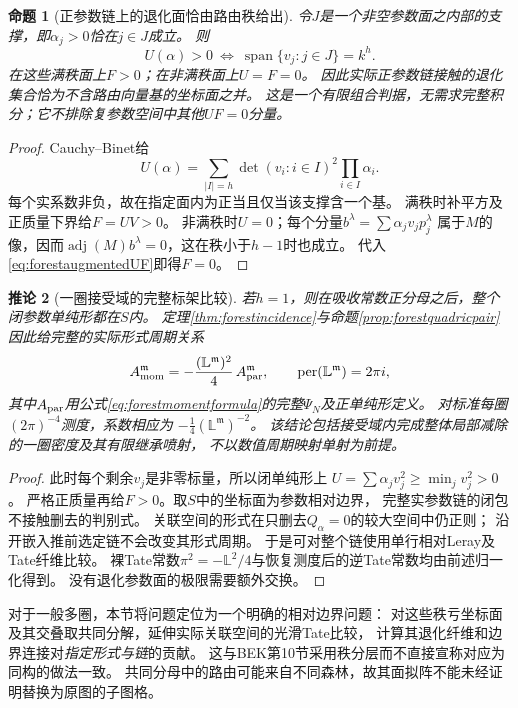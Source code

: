 \documentclass[11pt,a4paper]{ctexart}
\theoremstyle{cnplain}\newtheorem{theorem}{定理}[section]
\newtheorem{proposition}[theorem]{命题}
\newtheorem{corollary}[theorem]{推论}
\theoremstyle{definition}\newtheorem{definition}[theorem]{定义}
\theoremstyle{remark}\newtheorem{remark}[theorem]{注}
\begin{document}
\begin{proposition}[正参数链上的退化面恰由路由秩给出]
\label{prop:forestrankfaces}
令$J$是一个非空参数面之内部的支撑，即$\alpha_j>0$恰在$j\in J$成立。
则
\[
 U(\alpha)>0\ \Longleftrightarrow\
 \operatorname{span}\{v_j:j\in J\}=k^h.
\]
在这些满秩面上$F>0$；在非满秩面上$U=F=0$。
因此实际正参数链接触的退化集合恰为不含路由向量基的坐标面之并。
这是一个有限组合判据，无需求完整积分；它不排除复参数空间中其他$UF=0$分量。
\end{proposition}

\begin{proof}
Cauchy--Binet给
\[
 U(\alpha)=\sum_{|I|=h}\det(v_i:i\in I)^2\prod_{i\in I}\alpha_i.
\]
每个实系数非负，故在指定面内为正当且仅当该支撑含一个基。
满秩时补平方及正质量下界给$F=UV>0$。
非满秩时$U=0$；每个分量$b^\lambda=\sum\alpha_jv_jp_j^\lambda$
属于$M$的像，因而$\operatorname{adj}(M)b^\lambda=0$，这在秩小于$h-1$时也成立。
代入\eqref{eq:forestaugmentedUF}即得$F=0$。
\end{proof}

\begin{corollary}[一圈接受域的完整标架比较]
\label{cor:forestoneloopcomparison}
若$h=1$，则在吸收常数正分母之后，整个闭参数单纯形都在$S$内。
定理\ref{thm:forestincidence}与命题\ref{prop:forestquadricpair}因此给完整的实际形式周期关系
\[
 A_{\rm mom}^{\mathfrak m}
 =-\frac{(\mathbb L^{\mathfrak m})^2}{4}\,
 A_{\rm par}^{\mathfrak m},\qquad
 \operatorname{per}(\mathbb L^{\mathfrak m})=2\pi i,
\]
其中$A_{\rm par}$用公式\eqref{eq:forestmomentformula}的完整$\Psi_N$及正单纯形定义。
对标准每圈$(2\pi)^{-4}$测度，系数相应为
$-\tfrac14(\mathbb L^{\mathfrak m})^{-2}$。
该结论包括接受域内完成整体局部减除的一圈密度及其有限继承喷射，
不以数值周期映射单射为前提。
\end{corollary}

\begin{proof}
此时每个剩余$v_j$是非零标量，所以闭单纯形上
$U=\sum\alpha_jv_j^2\geq\min_jv_j^2>0$。
严格正质量再给$F>0$。取$S$中的坐标面为参数相对边界，
完整实参数链的闭包不接触删去的判别式。
关联空间的形式在只删去$Q_\alpha=0$的较大空间中仍正则；
沿开嵌入推前选定链不会改变其形式周期。
于是可对整个链使用单行相对Leray及Tate纤维比较。
裸Tate常数$\pi^2=-\mathbb L^2/4$与恢复测度后的逆Tate常数均由前述归一化得到。
没有退化参数面的极限需要额外交换。
\end{proof}

对于一般多圈，本节将问题定位为一个明确的相对边界问题：
对这些秩亏坐标面及其交叠取共同分解，延伸实际关联空间的光滑Tate比较，
计算其退化纤维和边界连接对\emph{指定形式与链}的贡献。
这与BEK第10节采用秩分层而不直接宣称对应为同构的做法一致。
共同分母中的路由可能来自不同森林，故其面拟阵不能未经证明替换为原图的子图格。
\end{document}
